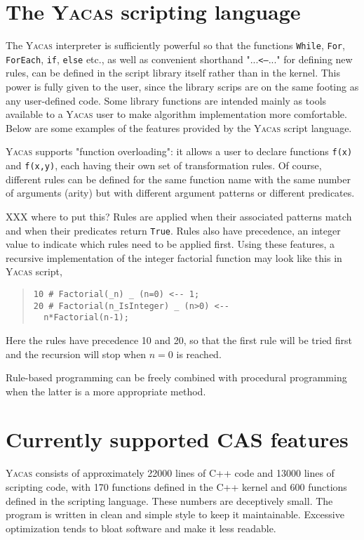 \documentclass{llncs}
\begin{document}
\section{The \textsc{Yacas} scripting language}
The \textsc{Yacas} interpreter is sufficiently powerful so that the functions \texttt{While},
\texttt{For}, \texttt{ForEach}, \texttt{if}, \texttt{else} etc., as well as convenient shorthand
"...\texttt{<--}..." for defining new rules, can be defined in the script library
itself rather than in the kernel. This power is fully given to the user, since
the library scrips are on the same footing as any user-defined code. Some
library functions are intended mainly as tools available to a \textsc{Yacas} user to
make algorithm implementation more comfortable. Below are some examples of the features provided by the \textsc{Yacas} script language.


\textsc{Yacas} supports "function overloading": it allows a user to declare functions
\texttt{f(x)} and \texttt{f(x,y)}, each having their own set of transformation rules. Of
course, different rules can be defined for the same function name with the same
number of arguments (arity) but with different argument patterns or different
predicates.



XXX where to put this?
Rules are applied when their associated patterns match and when their
predicates return \texttt{True}. Rules also have precedence, an integer value
to indicate which rules need to be applied first. Using these features, a
recursive implementation of the integer factorial function may look like this
in \textsc{Yacas} script,


\begin{quote}\small\begin{verbatim}
10 # Factorial(_n) _ (n=0) <-- 1;
20 # Factorial(n_IsInteger) _ (n>0) <--
  n*Factorial(n-1);
\end{verbatim}\end{quote}
Here the rules have precedence 10 and 20, so that the first rule will be tried first and the recursion will stop when $n = 0$ is reached.


Rule-based programming can be freely combined with procedural programming when
the latter is a more appropriate method.

\section{Currently supported CAS features}
\textsc{Yacas} consists of approximately 22000 lines of C++ code and  13000 lines of 
scripting code, with 170 functions defined in the C++ kernel and 600 functions
defined  in the scripting language. These numbers are deceptively small. The
program is written in clean and simple style to keep it maintainable. Excessive
optimization tends to bloat software and make it less readable.
\end{document}

